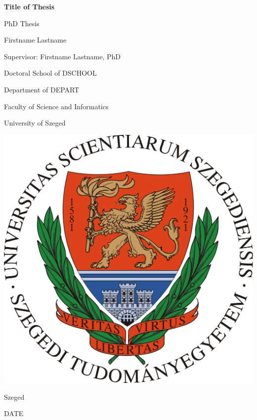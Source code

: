 
\thispagestyle{empty}

\begin{center}
	\vspace*{0.25cm}
	
	\begin{spacing}{2}
		{\Huge \textbf{Title of Thesis}}
	\end{spacing}
	
	\vspace*{2cm}
	
	{\Large PhD Thesis}
	
	\vfill
	
	{\Large Firstname Lastname}
	
	\vspace{0.25cm}
	
	{\Large Supervisor: Firstname Lastname, PhD}
	
	\vfill
	
	{\large Doctoral School of DSCHOOL}
	
	\vspace{0.25cm}
	
	{\large Department of DEPART}
	
	\vspace{0.25cm}
	
	{\large Faculty of Science and Informatics}
	
	\vspace{0.25cm}
	
	{\large University of Szeged}
	
	\vfill
	
	\includegraphics[width=0.3\linewidth]{Figures/szte_logo}
	
	\vfill
	
	{\large Szeged
		
		 DATE}
	
\end{center}
 
